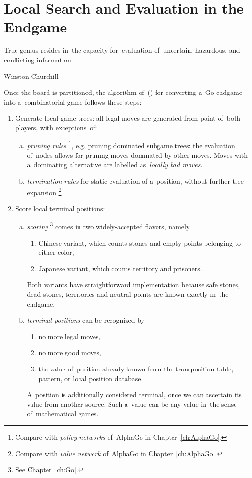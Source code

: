 \section{Local Search and Evaluation in the Endgame}
\epigraph{
  True genius resides in~the capacity for~evaluation of~uncertain, hazardous, and conflicting information. 
}{Winston Churchill}

Once the board is partitioned, the algorithm of~(\cite{Muller1995computer}) for converting a~Go endgame into a~combinatorial game follows these steps:
\begin{enumerate}
  \item Generate local game trees:
    all legal moves are generated from point of~both players, with exceptions~of:
    \begin{enumerate}[(a)]
      \item \emph{pruning rules}%
        \footnote{Compare with \emph{policy networks} of~AlphaGo in Chapter~\ref{ch:AlphaGo}.},
        e.g. pruning dominated subgame trees:
        the evaluation of~nodes allows for pruning moves dominated by other moves.
        Moves with a~dominating alternative are labelled as~\emph{locally bad moves}.

      \item \emph{termination rules} for static evaluation of a~position, without further tree expansion%
        \footnote{Compare with \emph{value network} of~AlphaGo in Chapter~\ref{ch:AlphaGo}.}
    \end{enumerate}

  \item Score local terminal positions:
    \begin{enumerate}[(a)]
      \item \emph{scoring}%
        \footnote{See Chapter~\ref{ch:Go}.}
        comes in two widely-accepted flavors, namely
        \begin{enumerate}[$\diamondsuit$]
          \item Chinese variant, which counts stones and empty points belonging to either color,
          \item Japanese variant, which counts territory and prisoners.
        \end{enumerate}
        Both variants have straightforward implementation because safe stones, dead stones, territories and neutral points are known exactly in~the endgame.

      \item \emph{terminal positions} can be recognized by
        \begin{enumerate}[$\diamondsuit$]
          \item no more legal moves,
          \item no more good moves,
          \item the value of~position already known from the transposition table, pattern, or local position database.
        \end{enumerate}
        A~position is additionally considered terminal, once we can ascertain its value from another source.
        Such a~value can be any value in~the sense of~mathematical games.


\end{enumerate}
\end{enumerate}
